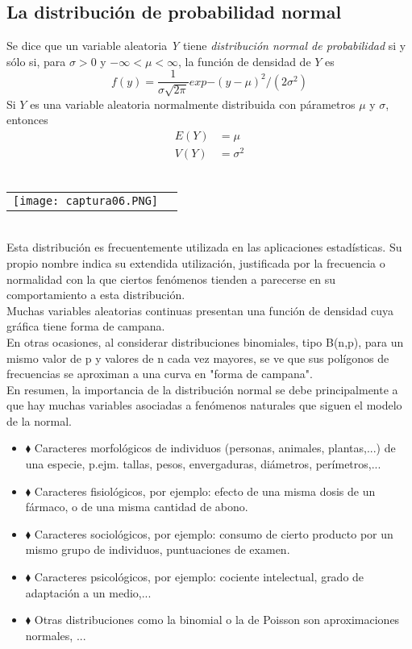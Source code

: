 \documentclass[10pt]{article}\usepackage[]{graphicx}\usepackage[]{color}
\begin{document}
\subsection{La distribución de probabilidad normal}
Se dice que un variable aleatoria \textit{Y} tiene \textit{distribución normal de probabilidad } si y sólo si, para $\sigma >0$ y $-\infty<\mu<\infty$, la función de densidad de $Y$ es
\begin{equation*}
f(y)=\frac{1}{\sigma\sqrt{2\pi}}exp{-(y-\mu)^2/(2\sigma^2)}
\end{equation*}
Si $Y$ es una variable aleatoria normalmente distribuida con párametros $\mu$ y $\sigma$, entonces
\begin{align*}
E(Y)&=\mu \\
V(Y)&=\sigma^2
\end{align*}\\ 
\begin{tabular}{p{} p{} }
\texttt{[image: captura06.PNG]}
\end{tabular}\\
Esta distribución es frecuentemente utilizada en las
aplicaciones estadísticas. Su propio nombre indica su extendida utilización,
justificada por la frecuencia o normalidad con la que ciertos fenómenos tienden
a parecerse en su comportamiento a esta distribución.\\
Muchas variables aleatorias continuas presentan una
función de densidad cuya gráfica tiene forma de campana.\\
En otras ocasiones, al considerar distribuciones
binomiales, tipo B(n,p), para un mismo valor de p y valores
de n cada vez mayores, se ve que sus polígonos de
frecuencias se aproximan a una curva en "forma de campana".\\
En resumen, la importancia de la distribución normal se debe principalmente a que hay muchas variables asociadas a fenómenos naturales que siguen el modelo de la normal.
\begin{itemize}
\item[]$\blacklozenge$ Caracteres morfológicos de individuos (personas, animales, plantas,...) de una especie, p.ejm. tallas, pesos, envergaduras, diámetros, perímetros,...\\
\item[]$\blacklozenge$ Caracteres fisiológicos, por ejemplo: efecto de una misma dosis de un fármaco, o de una misma cantidad de abono.\\
\item[] $\blacklozenge$ Caracteres sociológicos, por ejemplo: consumo de cierto producto por un mismo grupo de individuos, puntuaciones de examen.
\item[]$\blacklozenge$ Caracteres psicológicos, por ejemplo: cociente intelectual, grado de adaptación a un medio,...
\item[]$\blacklozenge$ Otras distribuciones como la binomial o la de Poisson son aproximaciones normales, ...
\end{itemize}
\end{document}

